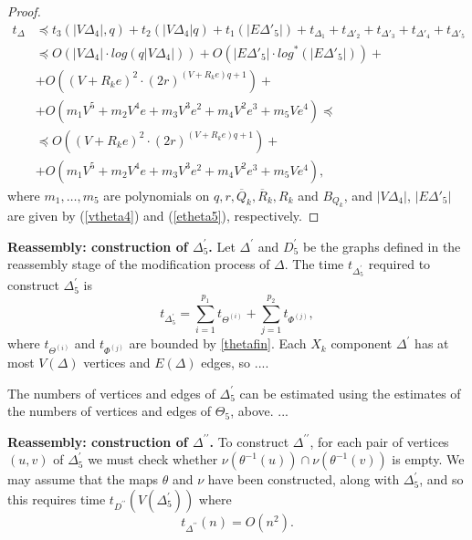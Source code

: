 \documentclass[a4paper,12pt]{article}
\newcommand{\D}{\Delta }
\numberwithin{equation}{section}
\numberwithin{figure}{section}
\begin{document}
\begin{proof}
\begin{equation}\label{thetafin}
\begin{split}
t_\D &\preceq t_3(|V \D_4|, q) + t_2(|V \D_4| q )+
t_1(|E\D'_5|)+t_{\D_1} + t_{\D'_2}+t_{\D'_3}+t_{\D'_4}+t_{\D'_5}\\
&\preceq O(|V \D_4|\cdot log(q |V \D_4|))+O (|E\D'_5| \cdot log^{\ast}(|E\D'_5|))+\\
&+O((V +R_k e)^2\cdot (2r)^{(V + R_k e) q +1})+\\
&+O(m_1 V^5 + m_2V^4 e +m_3 V^3 e^2 +m_4 V^2 e^3 + m_5 V e^4)\preceq\\
&\preceq O((V +R_k e)^2\cdot (2r)^{(V + R_k e) q +1})+ \\
&+O(m_1 V^5 + m_2V^4 e +m_3 V^3 e^2 +m_4 V^2 e^3 + m_5 V e^4),
\end{split}
\end{equation}
where $m_1, \ldots, m_5$ are polynomials on  $q, r,
\overline{Q}_k, \overline{R}_k, R_k$ and $B_{Q_k}$, and $|V
\D_4|$, $|E\D'_5|$ are given by (\ref{vtheta4}) and
(\ref{etheta5}), respectively.

\end{proof}

{\bf Reassembly: construction of $\D^\prime_5$.}
Let $\D^\prime$ and $D^\prime_5$ be the graphs defined in the
reassembly stage of the modification process of $\D$.
The time  $t_{\D^\prime_5}$ required to  construct $\D^{\prime}_5$
is %
\begin{equation}\label{eq:D'}
t_{\D^\prime_5}=\sum_{i=1}^{p_1} t_{\Theta^{(i)}}+
\sum_{j=1}^{p_2} t_{\Phi^{(j)}},
\end{equation}
where  $t_{\Theta^{(i)}}$ and $t_{\Phi^{(j)}}$ are bounded by \eqref{thetafin}.
Each $X_k$ component $\D^\prime$ has at most $V(\D)$ vertices
and $E(\D)$ edges, so ....


The numbers of vertices and edges of $\D_5^\prime$ can be estimated
using the estimates of the numbers of vertices and edges of $\Theta_5$, above.
...

{\bf Reassembly: construction of $\D^{\prime\prime}$.}
To construct $\D^{\prime\prime}$,
for each
pair of vertices $(u,v)$ of $\D^\prime_5$ we must check whether
$\nu(\theta^{-1}(u))\cap\nu(\theta^{-1}(v))$ is empty. We may assume that
the maps $\theta$ and $\nu$ have been constructed, along with $\D^\prime_5$,
and so this requires time $t_{D^{\prime\prime}}(V(\D^\prime_5))$ where
\begin{equation}\label{eq:D''}
t_{\D^{\prime\prime}}(n)=O(n^2).
\end{equation}
\end{document}
